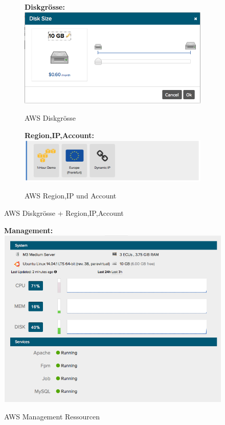 \begin{figure}[!htbp]
  \centering
  \begin{subfigure}[b]{.49\textwidth}
\textbf{Diskgrösse:}\\
\includegraphics[width=\textwidth]{./03_Analyse/03_Bitnami/images/aws_disk}
\caption{AWS Diskgrösse}
\end{subfigure}
  \hfill
\begin{subfigure}[b]{.49\textwidth}
\textbf{Region,IP,Account:}\\
\includegraphics[width=\textwidth]{./03_Analyse/03_Bitnami/images/aws_random}
\caption{AWS Region,IP und Account}
\end{subfigure}
\caption{AWS Diskgrösse + Region,IP,Account}
\end{figure}

\newpage
 
\begin{figure}[!htbp]
   \centering
    \textbf{Management:}\\
\includegraphics[width=.5\textwidth]{./03_Analyse/03_Bitnami/images/aws_resourcen}
\caption{AWS Management Ressourcen}
\end{figure}



